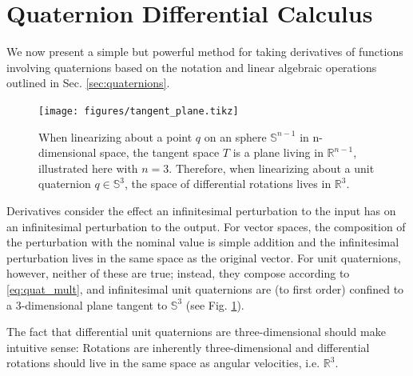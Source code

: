\documentclass[letterpaper, 10 pt, conference]{ieeeconf}  %
\newcommand{\R}{\mathbb{R}}
\newcommand{\Q}{\mathbb{S}^3}
\begin{document}
\section{Quaternion Differential Calculus} \label{sec:Quaternion_Calculus}
    We now present a simple but powerful method for taking derivatives of functions 
    involving quaternions based on the notation and linear algebraic operations outlined 
    in Sec. \ref{sec:quaternions}.
    
    \begin{figure}
        \centering
        \texttt{[image: figures/tangent\_plane.tikz]}
        \caption{
            When linearizing about a point $q$ on an sphere $\mathbb{S}^{n-1}$ in 
            n-dimensional space, the tangent space $T$ is a plane living in $\R^{n-1}$, 
            illustrated here with $n=3$. Therefore, when linearizing about a unit 
            quaternion $q \in \Q$, the space of differential rotations lives in $\R^3$.
        }
        \label{fig:tangent_plane}
    \end{figure}
        
        Derivatives consider the effect an infinitesimal perturbation to the input has on
        an infinitesimal perturbation to the output. For vector spaces, the composition
        of the perturbation with the nominal value is simple addition and the
        infinitesimal perturbation lives in the same space as the original vector. For
        unit quaternions, however, neither of these are true; instead, they compose
        according to \eqref{eq:quat_mult}, and infinitesimal unit quaternions are (to
        first order) confined to a 3-dimensional plane tangent to $\Q$ (see Fig.
        \ref{fig:tangent_plane}).

        The fact that differential unit quaternions are three-dimensional should make
        intuitive sense: Rotations are inherently three-dimensional and differential
        rotations should live in the same space as angular velocities, i.e. $\R^3$.
        
\end{document}
